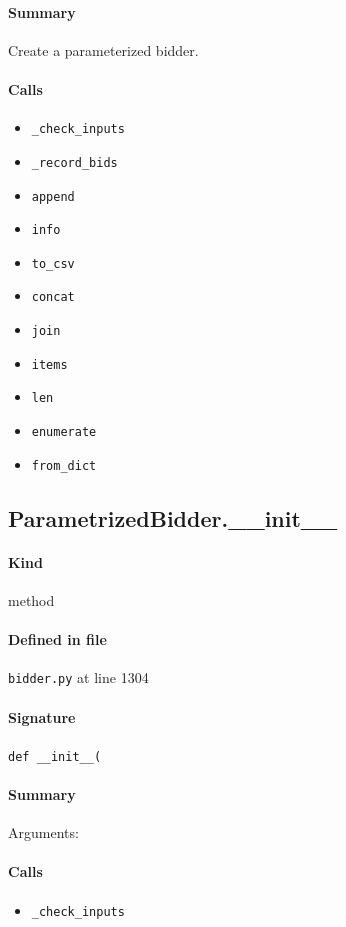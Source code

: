 \documentclass[11pt]{report}
\begin{document}
\paragraph{Summary} Create a parameterized bidder.
\paragraph{Calls}
\begin{itemize}[leftmargin=*]
  \item \texttt{\_check\_inputs}
  \item \texttt{\_record\_bids}
  \item \texttt{append}
  \item \texttt{info}
  \item \texttt{to\_csv}
  \item \texttt{concat}
  \item \texttt{join}
  \item \texttt{items}
  \item \texttt{len}
  \item \texttt{enumerate}
  \item \texttt{from\_dict}
\end{itemize}
\subsection{ParametrizedBidder.\_\_init\_\_}
\label{def:bidder.py:ParametrizedBidder.__init__:L1304}
\paragraph{Kind} method
\paragraph{Defined in file} \texttt{bidder.py} at line 1304
\paragraph{Signature} \texttt{def \_\_init\_\_(}
\paragraph{Summary} Arguments:
\paragraph{Calls}
\begin{itemize}[leftmargin=*]
  \item \texttt{\_check\_inputs}
\end{itemize}
\end{document}

